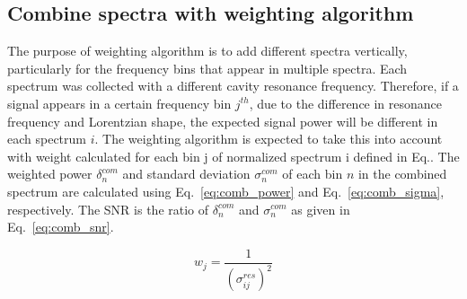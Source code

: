 
\subsection{Combine spectra with weighting algorithm} \label{weighting_algorithm}

The purpose of weighting algorithm is to add different spectra vertically, particularly for the frequency bins that appear in multiple spectra.  %
Each spectrum was collected with a different cavity resonance frequency. Therefore, if a signal appears in a certain frequency bin $j^{th}$, due to the difference in resonance frequency and Lorentzian shape, the expected signal power will be different in each spectrum $i$. The weighting algorithm is expected to take this into account with weight calculated for each bin j of normalized spectrum i defined in Eq.\cite{eq:weight}.
The weighted power $\delta^{com}_{n}$ and standard deviation $\sigma^{com}_{n}$ of each bin $n$ in the combined spectrum are calculated using Eq.~\ref{eq:comb_power} and Eq.~\ref{eq:comb_sigma}, respectively. The SNR is the ratio of $\delta^{com}_{n}$ and $\sigma^{com}_{n}$ as given in Eq.~\ref{eq:comb_snr}.


\begin{equation}
    \label{eq:weight}
    {w_{j}} = \frac{1}{(\sigma_{ij}^{res})^{2}}
\end{equation}


